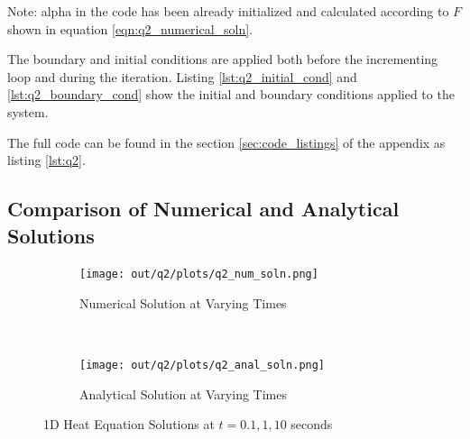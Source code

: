 \documentclass[12pt]{article}
\begin{document}
\noindent Note: alpha in the code has been already initialized and calculated according to $F$ shown in equation \ref{eqn:q2_numerical_soln}.

\noindent The boundary and initial conditions are applied both before the incrementing loop and during the iteration. Listing \ref{lst:q2_initial_cond} and \ref{lst:q2_boundary_cond} show the initial and boundary conditions applied to the system.





\noindent The full code can be found in the section \ref{sec:code_listings} of the appendix as listing \ref{lst:q2}.

\subsection{Comparison of Numerical and Analytical Solutions}

\begin{figure}[H]
    \centering
    \begin{subfigure}[]{0.75\textwidth}
        \centering
        \texttt{[image: out/q2/plots/q2\_num\_soln.png]}
        \caption{Numerical Solution at Varying Times}
        \label{fig:q2_num_plot}
    \end{subfigure}
    \\
    \begin{subfigure}[]{0.75\textwidth}
        \centering
        \texttt{[image: out/q2/plots/q2\_anal\_soln.png]}
        \caption{Analytical Solution at Varying Times}
        \label{fig:q2_anal_plot}
    \end{subfigure}
    \caption{1D Heat Equation Solutions at $t = 0.1, 1, 10$ seconds}
    \label{fig:q2_plots}
\end{figure}
\end{document}
